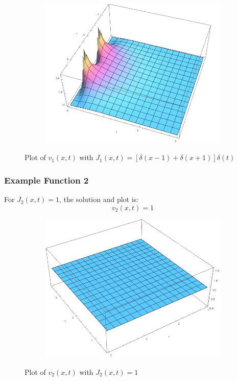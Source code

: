 \documentclass[12pt]{article}
\begin{document}
\begin{figure}[H]
	\centering
	\begin{subfigure}[h]{0.8\textwidth}
        \includegraphics[width=\textwidth]{Part1Plots/plot1}
    \end{subfigure}
    \caption{Plot of $v_1(x,t)$ with $J_{1}(x,t)=[\delta(x-1)+\delta(x+1)]\delta(t)$} \label{fig:jext1}
\end{figure}

\pagebreak
\subsubsection{Example Function 2}
For $J_{2}(x,t) = 1$, the solution and plot is:
$$ v_2(x,t) = 1 $$

\begin{figure}[H]
	\centering
	\begin{subfigure}[h]{0.8\textwidth}
        \includegraphics[width=\textwidth]{Part1Plots/plot2}
    \end{subfigure}
    \caption{Plot of $v_2(x,t)$ with $J_{2}(x,t)=1$} \label{fig:jext2}
\end{figure}
\end{document}
